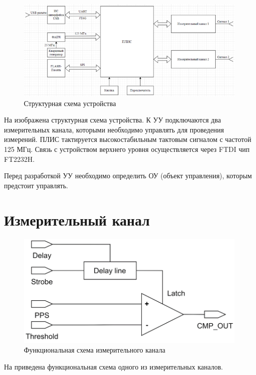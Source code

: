 \begin{figure}[ht!] 
	\center
	\includegraphics {my_folder/images//scheme_struct}
	\caption{Структурная схема устройства} 
	\label{fig:scheme-struct}  
\end{figure}

На  изображена структурная схема устройства.
К УУ подключаются два измерительных канала, которыми необходимо управлять для проведения измерений.
ПЛИС тактируется высокостабильным тактовым сигналом с частотой 125 МГц. Связь с устройством верхнего уровня
осуществляется через FTDI чип FT2232H.

Перед разработкой УУ необходимо определить ОУ (объект управления), которым предстоит управлять.

\section{Измерительный канал}

\begin{figure}[ht!] 
	\center
	\includegraphics {my_folder/images//ch_func}
	\caption{Функциональная схема измерительного канала} 
	\label{fig:ch-func}  
\end{figure}

На  приведена функциональная схема одного из измерительных каналов.


